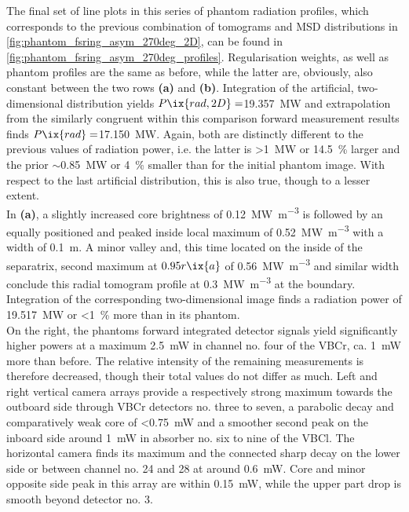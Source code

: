                 The final set of line plots in this series of phantom radiation profiles, which corresponds to the previous combination of tomograms and MSD distributions in \cref{fig:phantom_fsring_asym_270deg_2D}, can be found in \cref{fig:phantom_fsring_asym_270deg_profiles}. Regularisation weights, as well as phantom profiles are the same as before, while the latter are, obviously, also constant between the two rows \textbf{(a)} and \textbf{(b)}. Integration of the artificial, two-dimensional distribution yields $P\ix{rad,2D}=$\SI{19.357}{\mega\watt} and extrapolation from the similarly congruent within this comparison forward measurement results finds $P\ix{rad}=$\SI{17.150}{\mega\watt}. Again, both are distinctly different to the previous values of radiation power, i.e. the latter is >\SI{1}{\mega\watt} or \SI{14.5}{\percent} larger and the prior $\sim$\SI{0.85}{\mega\watt} or \SI{4}{\percent} smaller than for the initial phantom image. With respect to the last artificial distribution, this is also true, though to a lesser extent.\\%
                In \textbf{(a)}, a slightly increased core brightness of \SI{0.12}{\mega\watt\per\cubic\meter} is followed by an equally positioned and peaked inside local maximum of \SI{0.52}{\mega\watt\per\cubic\meter} with a width of \SI{0.1}{\meter}. A minor valley and, this time located on the inside of the separatrix, second maximum at $0.95r\ix{a}$ of \SI{0.56}{\mega\watt\per\cubic\meter} and similar width conclude this radial tomogram profile at \SI{0.3}{\mega\watt\per\cubic\meter} at the boundary. Integration of the corresponding two-dimensional image finds a radiation power of \SI{19.517}{\mega\watt} or <\SI{1}{\percent} more than in its phantom.\\%
                On the right, the phantoms forward integrated detector signals yield significantly higher powers at a maximum \SI{2.5}{\milli\watt} in channel no. four of the VBCr, ca. \SI{1}{\milli\watt} more than before. The relative intensity of the remaining measurements is therefore decreased, though their total values do not differ as much. Left and right vertical camera arrays provide a respectively strong maximum towards the outboard side through VBCr detectors no. three to seven, a parabolic decay and comparatively weak core of <\SI{0.75}{\milli\watt} and a smoother second peak on the inboard side around \SI{1}{\milli\watt} in absorber no. six to nine of the VBCl. The horizontal camera finds its maximum and the connected sharp decay on the lower side or between channel no. 24 and 28 at around \SI{0.6}{\milli\watt}. Core and minor opposite side peak in this array are within \SI{0.15}{\milli\watt}, while the upper part drop is smooth beyond detector no. 3.\\%
